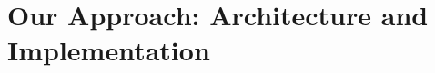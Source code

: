 \graphicspath{{Figures/}}

\chapter{Our Approach: Architecture and Implementation} %
\label{cha:system_implementation}





 

